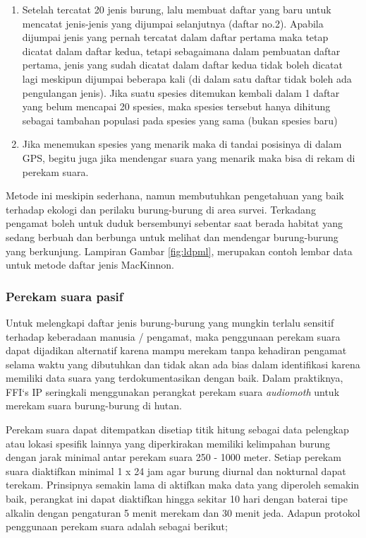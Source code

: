 \documentclass[
  oneside]{book}
\begin{document}
\begin{enumerate}
\def\labelenumi{\arabic{enumi}.}
\setcounter{enumi}{1}
\item
  Setelah tercatat 20 jenis burung, lalu membuat daftar yang baru untuk mencatat jenis-jenis yang dijumpai selanjutnya (daftar no.2). Apabila dijumpai jenis yang pernah tercatat dalam daftar pertama maka tetap dicatat dalam daftar kedua, tetapi sebagaimana dalam pembuatan daftar pertama, jenis yang sudah dicatat dalam daftar kedua tidak boleh dicatat lagi meskipun dijumpai beberapa kali (di dalam satu daftar tidak boleh ada pengulangan jenis). Jika suatu spesies ditemukan kembali dalam 1 daftar yang belum mencapai 20 spesies, maka spesies tersebut hanya dihitung sebagai tambahan populasi pada spesies yang sama (bukan spesies baru)
\item
  Jika menemukan spesies yang menarik maka di tandai posisinya di dalam GPS, begitu juga jika mendengar suara yang menarik maka bisa di rekam di perekam suara.
\end{enumerate}

Metode ini meskipin sederhana, namun membutuhkan pengetahuan yang baik terhadap ekologi dan perilaku burung-burung di area survei. Terkadang pengamat boleh untuk duduk bersembunyi sebentar saat berada habitat yang sedang berbuah dan berbunga untuk melihat dan mendengar burung-burung yang berkunjung. Lampiran Gambar \ref{fig:ldpml}, merupakan contoh lembar data untuk metode daftar jenis MacKinnon.

\hypertarget{perekam-suara-pasif}{%
\subsubsection*{Perekam suara pasif}\label{perekam-suara-pasif}}

Untuk melengkapi daftar jenis burung-burung yang mungkin terlalu sensitif terhadap keberadaan manusia / pengamat, maka penggunaan perekam suara dapat dijadikan alternatif karena mampu merekam tanpa kehadiran pengamat selama waktu yang dibutuhkan dan tidak akan ada bias dalam identifikasi karena memiliki data suara yang terdokumentasikan dengan baik. Dalam praktiknya, FFI`s IP seringkali menggunakan perangkat perekam suara \emph{audiomoth} untuk merekam suara burung-burung di hutan.

Perekam suara dapat ditempatkan disetiap titik hitung sebagai data pelengkap atau lokasi spesifik lainnya yang diperkirakan memiliki kelimpahan burung dengan jarak minimal antar perekam suara 250 - 1000 meter. Setiap perekam suara diaktifkan minimal 1 x 24 jam agar burung diurnal dan nokturnal dapat terekam. Prinsipnya semakin lama di aktifkan maka data yang diperoleh semakin baik, perangkat ini dapat diaktifkan hingga sekitar 10 hari dengan baterai tipe alkalin dengan pengaturan 5 menit merekam dan 30 menit jeda. Adapun protokol penggunaan perekam suara adalah sebagai berikut;
\end{document}
